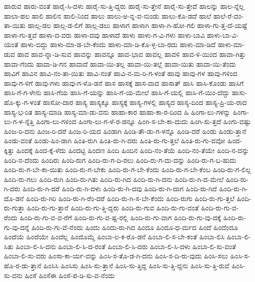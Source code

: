 {ಹಾರುವ
ಹಾರು-ವಂತೆ
ಹಾರೈ-ಸಿ-ದಳು
ಹಾರೈ-ಸು-ತ್ತಿ-ದ್ದರು
ಹಾರೈ-ಸು-ತ್ತೇನೆ
ಹಾರೈ-ಸು-ತ್ತೇವೆ
ಹಾಲನ್ನು
ಹಾಲ-ನ್ನೆಲ್ಲ
ಹಾಲಾ-ಹಲ
ಹಾಲಿ
ಹಾಲಿನ
ಹಾಲಿ-ನಿಂದ
ಹಾಲು
ಹಾಲು-ಅ-ನ್ನ-ವ-ನುಂಡು
ಹಾಲು-ಕೊ-ಡದೆ
ಹಾಲೆ
ಹಾಲೆ-ರೆ-ದಂ-ತಾ-ಯಿತು
ಹಾಲ್ಗ-ಡಲ
ಹಾಲ್ಗ-ಡ-ಲಿಗೆ
ಹಾಲ್ಗ-ಡಲು
ಹಾಳಾಗ
ಹಾಳಾಗಿ
ಹಾಳಾ-ಗಿ-ಹೋ-ಗಲಿ
ಹಾಳಾ-ಗು-ತ್ತ-ದೆ-ಯಷ್ಟೆ
ಹಾಳಾ-ಗು-ತ್ತವೆ
ಹಾಳಾ-ದ-ವರು
ಹಾಳಾ-ದವು
ಹಾಳಾದೆ
ಹಾಳು
ಹಾಳು-ಗ-ವಿ-ಗಳು
ಹಾಳು-ಬಾವಿ
ಹಾಳು-ಬಾ-ವಿ-ಯಂತೆ
ಹಾಳು-ಬಿದ್ದು
ಹಾಳು-ಮಾ-ಡ-ಬೇ-ಕೆಂದು
ಹಾಳು-ಮಾ-ಡಿ-ಕೊ-ಳ್ಳ-ಬಾ-ರದು
ಹಾಳು-ಮಾ-ಡಿದೆ
ಹಾಳು-ಮಾ-ಡುವ
ಹಾವ
ಹಾವ-ನ್ನಾ-ಡಿ-ಸುವ
ಹಾವನ್ನು
ಹಾವನ್ನೂ
ಹಾವ-ಭಾವ
ಹಾವಲ್ಲ
ಹಾವಳಿ
ಹಾವ-ಳಿ-ಯಿಂದ
ಹಾವಾ-ಗಿತ್ತು
ಹಾವಾ-ಗೆಂದು
ಹಾವಾ-ಡಿ-ಗನ
ಹಾವಾದೆ
ಹಾವಾ-ಯಿ-ತಲ್ಲ
ಹಾವಾ-ಯಿ-ತಲ್ಲೆ
ಹಾವಾ-ಯಿತು
ಹಾವಾ-ಯಿ-ತೆಂದು
ಹಾವಿಗೆ
ಹಾವಿನ
ಹಾವಿ-ನಂ-ತಾ-ಯಿತು
ಹಾವಿ-ನಂತೆ
ಹಾವಿ-ನ-ಮ-ರಿ-ಗ-ಳಂತೆ
ಹಾವು
ಹಾವು-ಗಳ
ಹಾವು-ಗಳಿಂದ
ಹಾವು-ಗ-ಳಿಗೆ
ಹಾವು-ಗಳು
ಹಾವು-ಗ-ಳೊ-ಡನೆ
ಹಾಸ
ಹಾಸಕ್ಕೆ
ಹಾಸ-ವಾದ
ಹಾಸಾತ್
ಹಾಸಿ
ಹಾಸಿ-ಕೊಂಡು
ಹಾಸಿಗೆ
ಹಾಸಿ-ಗೆ-ಗ-ಳೇನು
ಹಾಸಿ-ಗೆಯ
ಹಾಸಿ-ಗೆ-ಯನ್ನು
ಹಾಸಿ-ಗೆ-ಯ-ಮೇಲೆ
ಹಾಸಿ-ಗೆ-ಯಲ್ಲಿ
ಹಾಸಿ-ಗೆ-ಯಿಂ-ದೆದ್ದು
ಹಾಸು-ಹೊ-ಕ್ಕು-ಗ-ಳಂತೆ
ಹಾಸೋ-ದಾರ
ಹಾಸ್ಯ
ಹಾಸ್ಯಕ್ಕೂ
ಹಾಸ್ಯಕ್ಕೆ
ಹಾಸ್ಯ-ಗಳಲ್ಲಿ
ಹಾಸ್ಯದ
ಹಾಸ್ಯ-ದಿಂದ
ಹಾಸ್ಯ-ಪ್ರಿ-ಯ-ರಾದ
ಹಾಸ್ಯ-ಭ-ರಿತ
ಹಾಸ್ಯ-ಮಾಡಿ
ಹಾಸ್ಯ-ಮಾ-ಡು-ವನು
ಹಾಹಾ-ಕಾರ
ಹಾಹಾ-ಕಾ-ರ-ದಿಂದ
ಹಿ
ಹಿಂಗಾ-ಲು-ಗಳನ್ನು
ಹಿಂಗಾ-ಲು-ಗ-ಳ-ನ್ನೆತ್ತಿ
ಹಿಂಗಾ-ಲು-ಗಳಿಂದ
ಹಿಂಗಾ-ಲು-ಗ-ಳೆ-ರ-ಡನ್ನೂ
ಹಿಂಗಿ-ಸ-ಬೇ-ಕಾ-ದುದು
ಹಿಂಗಿ-ಸು-ತ್ತದೆ
ಹಿಂಗು-ವಷ್ಟು
ಹಿಂಜ-ರಿ-ದನು
ಹಿಂಜ-ರಿ-ದರೆ
ಹಿಂಜ-ರಿ-ಯದ
ಹಿಂಡಾಗಿ
ಹಿಂಡಿ-ತೌ-ಡು-ಗ-ಳನ್ನೊ
ಹಿಂಡಿ-ದರೆ
ಹಿಂಡು
ಹಿಂಡು-ತ್ತಾನೆ
ಹಿಂಡು-ವಂತೆ
ಹಿಂಡು-ಹಿಂ-ಡಾಗಿ
ಹಿಂತಿ-ರುಗಿ
ಹಿಂತಿ-ರು-ಗಿ-ದರು
ಹಿಂತಿ-ರು-ಗು-ತ್ತಲೆ
ಹಿಂತಿ-ರು-ಗು-ವವೋ
ಹಿಂದ-ಕ್ಕಿತ್ತು
ಹಿಂದಕ್ಕೆ
ಹಿಂದ-ಕ್ಕೆ-ಳೆದು
ಹಿಂದಟ್ಟಿ
ಹಿಂದಣ
ಹಿಂದಿ
ಹಿಂದಿನ
ಹಿಂದಿ-ನಂ-ತೆಯೆ
ಹಿಂದಿ-ನಂ-ತೆಯೇ
ಹಿಂದಿ-ನ-ದನ್ನು
ಹಿಂದಿ-ನ-ದೆಂದು
ಹಿಂದಿರು
ಹಿಂದಿ-ರುಗ
ಹಿಂದಿ-ರು-ಗ-ದಿ-ರಲು
ಹಿಂದಿ-ರು-ಗ-ದು-ದನ್ನು
ಹಿಂದಿ-ರು-ಗ-ಬ-ಹುದು
ಹಿಂದಿ-ರು-ಗ-ಬೇ-ಕಾ-ಯಿತು
ಹಿಂದಿ-ರು-ಗ-ಬೇಕು
ಹಿಂದಿ-ರು-ಗ-ಬೇ-ಕೆಂದು
ಹಿಂದಿ-ರು-ಗ-ಬೇ-ಕೆಂಬ
ಹಿಂದಿ-ರು-ಗ-ಲಿಲ್ಲ
ಹಿಂದಿ-ರು-ಗಲು
ಹಿಂದಿ-ರುಗಿ
ಹಿಂದಿ-ರು-ಗಿತು
ಹಿಂದಿ-ರು-ಗಿದ
ಹಿಂದಿ-ರು-ಗಿ-ದನು
ಹಿಂದಿ-ರು-ಗಿ-ದ-ಮೇಲೆ
ಹಿಂದಿ-ರು-ಗಿ-ದರು
ಹಿಂದಿ-ರು-ಗಿ-ದರೆ
ಹಿಂದಿ-ರು-ಗಿ-ದಳು
ಹಿಂದಿ-ರು-ಗಿ-ದವು
ಹಿಂದಿ-ರು-ಗಿ-ದಾಗ
ಹಿಂದಿ-ರು-ಗಿದೆ
ಹಿಂದಿ-ರು-ಗಿ-ದೊ-ಡನೆ
ಹಿಂದಿ-ರು-ಗಿರಿ
ಹಿಂದಿ-ರು-ಗಿ-ರೆಂ-ದರೆ
ಹಿಂದಿ-ರು-ಗಿ-ಸ-ಬೇ-ಕೆಂದು
ಹಿಂದಿ-ರುಗು
ಹಿಂದಿ-ರು-ಗು-ತ್ತಲೆ
ಹಿಂದಿ-ರು-ಗುತ್ತಾ
ಹಿಂದಿ-ರು-ಗು-ತ್ತಾನೆ
ಹಿಂದಿ-ರು-ಗು-ತ್ತಿ-ದ್ದರು
ಹಿಂದಿ-ರು-ಗುವ
ಹಿಂದಿ-ರು-ಗು-ವಂತೆ
ಹಿಂದಿ-ರು-ಗು-ವ-ರೆಂದು
ಹಿಂದಿ-ರು-ಗು-ವ-ವ-ರೆಗೆ
ಹಿಂದಿ-ರು-ಗು-ವ-ಷ್ಟ-ರಲ್ಲಿ
ಹಿಂದಿ-ರು-ಗು-ವಾಗ
ಹಿಂದಿ-ರು-ಗು-ವು-ದಕ್ಕೆ
ಹಿಂದಿ-ರು-ಗು-ವು-ದನ್ನೆ
ಹಿಂದಿ-ರು-ಗು-ವೆ-ನೆಂದು
ಹಿಂದು
ಹಿಂದು-ರು-ಗಿದ
ಹಿಂದೂ
ಹಿಂದೂ-ಧ-ರ್ಮದ
ಹಿಂದೆ
ಹಿಂದೆಂದೂ
ಹಿಂದೆಯೆ
ಹಿಂದೆಯೇ
ಹಿಂದೆಲ್ಲ
ಹಿಂದೊಮ್ಮೆ
ಹಿಂಬಾ-ಲ-ಕ-ರೊ-ಡನೆ
ಹಿಂಬಾ-ಲಿ-ಸ-ಬೇ-ಕಂತೆ
ಹಿಂಬಾ-ಲಿಸಿ
ಹಿಂಬಾ-ಲಿ-ಸಿತು
ಹಿಂಬಾ-ಲಿ-ಸಿ-ದನು
ಹಿಂಬಾ-ಲಿ-ಸಿ-ದ-ರಂತೆ
ಹಿಂಬಾ-ಲಿ-ಸಿ-ದರು
ಹಿಂಬಾ-ಲಿ-ಸಿ-ದಳು
ಹಿಂಬಾ-ಲಿ-ಸು-ವಂತೆ
ಹಿಂಬಾ-ಲಿ-ಸು-ವರು
ಹಿಂಸಾ-ಕಾ-ರ್ಯ-ವನ್ನು
ಹಿಂಸಿ-ಸ-ತೊ-ಡ-ಗಿ-ದನು
ಹಿಂಸಿ-ಸ-ದಿ-ರು-ವುದು
ಹಿಂಸಿ-ಸಲು
ಹಿಂಸಿ-ಸ-ಹೊ-ರ-ಡು-ತ್ತಾನೆ
ಹಿಂಸಿಸಿ
ಹಿಂಸಿಸು
ಹಿಂಸಿ-ಸು-ತ್ತಾನೆ
ಹಿಂಸಿ-ಸು-ತ್ತಿದ್ದ
ಹಿಂಸಿ-ಸು-ತ್ತಿ-ದ್ದನು
ಹಿಂಸಿ-ಸು-ತ್ತಿ-ರುವೆ
ಹಿಂಸಿ-ಸು-ವನು
ಹಿಂಸೆ
ಹಿಂಸೆಈ
ಹಿಂಸೆ-ಪ-ಡಿ-ಸು-ವ-ನೆಂದು
}
